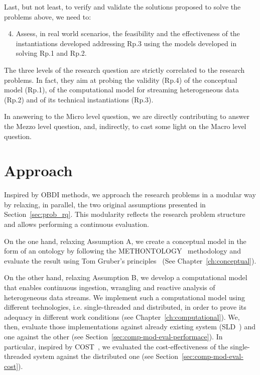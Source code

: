 Last, but not least, to verify and validate the solutions proposed to solve the problems above, we need to:
\begin{enumerate}[leftmargin=32pt,label=\textsf{Rp.\arabic*}]
\setcounter{enumi}{3}
\item Assess, in real world scenarios, the feasibility and the effectiveness of the instantiations developed addressing \textsf{Rp.3} using the models developed in solving \textsf{Rp.1} and \textsf{Rp.2}.
\end{enumerate}

The three levels of the research question are strictly correlated to the research problems.
In fact, they aim at probing the validity (\textsf{Rp.4}) of the conceptual model (\textsf{Rp.1}), of the  computational model for streaming heterogeneous data (\textsf{Rp.2}) and of its technical instantiations (\textsf{Rp.3}).

In answering to the Micro level question, we are directly contributing to answer the Mezzo level question, and, indirectly, to cast some light on the Macro level question. 

\section{Approach}\label{sec:approach}
Inspired by OBDI methods, we approach the research problems in a modular way by relaxing, in parallel, the two original assumptions presented in Section~\ref{sec:prob_rq}.
This modularity reflects the research problem structure and allows performing a continuous evaluation.

On the one hand, relaxing Assumption A, we create a conceptual model in the form of an ontology by following the METHONTOLOGY~\cite{fernandez1997methontology} methodology and evaluate the result using Tom Gruber's principles~\cite{gruber1995toward} (See Chapter~\ref{ch:conceptual}).

On the other hand, relaxing Assumption B, we develop a computational model that enables continuous ingestion, wrangling and reactive analysis of heterogeneous data streams.
We implement such a computational model using different technologies, i.e. single-threaded and distributed, in order to prove its adequacy in different work conditions (see Chapter~\ref{ch:computational}).
We, then, evaluate those implementations against already existing system (SLD~\cite{DBLP:conf/semweb/BalduiniVDTPC13}) and one against the other (see Section~\ref{sec:comp-mod-eval-performace}). In particular, inspired by COST~\cite{mcsherry2015scalability}, we evaluated the cost-effectiveness of the single-threaded system against the distributed one (see Section~\ref{sec:comp-mod-eval-cost}).

